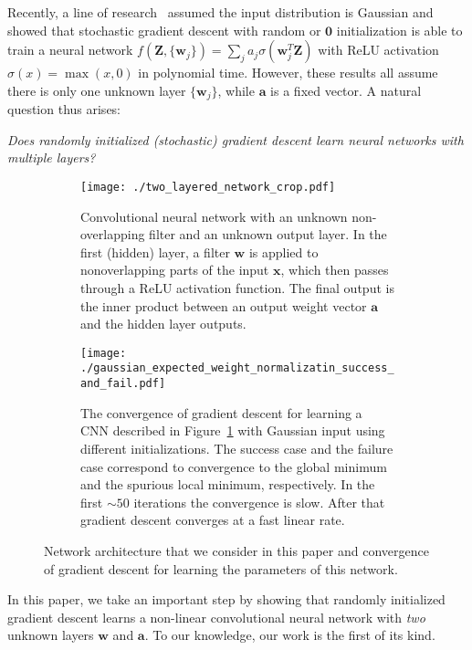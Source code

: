 \documentclass{article}
\newcommand{\firstlayer}{w}
\newcommand{\secondlayer}{a}
\def\vw{\mathbf{w}}
\def\va{\mathbf{a}}
\def\vZ{\mathbf{Z}}
\newcommand{\mat}[1]{\mathbf{#1}}
\newcommand{\vect}[1]{\mathbf{#1}}
\begin{document}
Recently, a line of research~\citep{tian2017analytical,brutzkus2017globally,li2017convergence,soltanolkotabi2017learning,shalev2017weight} assumed the input distribution is Gaussian and showed that stochastic gradient descent with random or $\vect{0}$ initialization is able to train a neural network $f(\mat{Z}, \{\vw_j\}) = \sum_j a_j\sigma(\vw_j^T\vZ)$ with ReLU activation $\sigma(x) = \max(x, 0)$ in polynomial time.
However, these results all assume there is only one unknown layer $\{\vw_j\}$, while $\va$ is a fixed vector. A natural question thus arises:
\begin{center}
\emph{Does randomly initialized (stochastic) gradient descent learn  neural networks with multiple layers?}
\end{center}\begin{figure*}
	\centering
	\begin{subfigure}[t]{0.45\textwidth}
		\texttt{[image: ./two\_layered\_network\_crop.pdf]}
		\caption{Convolutional neural network with an unknown non-overlapping filter and an unknown output layer.
	In the first (hidden) layer, a filter $\vect{\firstlayer}$ is applied to nonoverlapping parts of the input $\vect{x}$, which then passes through a ReLU activation function. 
	The final output is the inner product between an output weight vector $\vect{\secondlayer}$ and the hidden layer outputs.
	}\label{fig:architecture}
	\end{subfigure}	
	\qquad	
	\begin{subfigure}[t]{0.45\textwidth}
	\texttt{[image: ./gaussian\_expected\_weight\_normalizatin\_success\_and\_fail.pdf]}
		\caption{The convergence of gradient descent for learning a CNN described in Figure~\ref{fig:architecture} with Gaussian input using different initializations.
The success case and the failure case correspond to convergence to the global minimum and the spurious local minimum, respectively.
In the first $\sim 50$ iterations the convergence is slow. 
After that gradient descent converges at a fast linear rate. 
			}\label{fig:gd_convergence}
	\end{subfigure}	
	\caption{Network architecture that we consider in this paper and convergence of gradient descent for learning the parameters of this network.
} 
    \label{fig:architecture_and_convergence}
\end{figure*}

In this paper, we take an important step by showing that randomly initialized gradient descent learns a non-linear convolutional neural network with \emph{two} unknown layers $\vw$ and $\va$. 
To our knowledge, our work is the first of its kind. 
\end{document}
